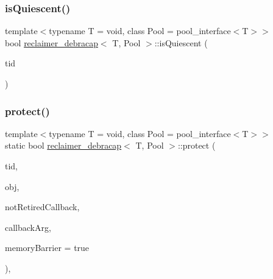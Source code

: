 \subsubsection{\texorpdfstring{is\+Quiescent()}{isQuiescent()}}
{\footnotesize\ttfamily template$<$typename T  = void, class Pool  = pool\+\_\+interface$<$\+T$>$$>$ \\
bool \hyperlink{classreclaimer__debracap}{reclaimer\+\_\+debracap}$<$ T, Pool $>$\+::is\+Quiescent (\begin{DoxyParamCaption}\item[{const int}]{tid }\end{DoxyParamCaption})\hspace{0.3cm}{\ttfamily [inline]}}

\mbox{\label{classreclaimer__debracap_a282205dc0800fb9dc45e13233f20b413}} 
\subsubsection{\texorpdfstring{protect()}{protect()}}
{\footnotesize\ttfamily template$<$typename T  = void, class Pool  = pool\+\_\+interface$<$\+T$>$$>$ \\
static bool \hyperlink{classreclaimer__debracap}{reclaimer\+\_\+debracap}$<$ T, Pool $>$\+::protect (\begin{DoxyParamCaption}\item[{const int}]{tid,  }\item[{T $\ast$const}]{obj,  }\item[{\hyperlink{globals_8h_a57f5c0d40b156d7d996492fb2f16e3cd}{Callback\+Type}}]{not\+Retired\+Callback,  }\item[{\hyperlink{globals_8h_a3de64ef48066ac6430631c8b81a15345}{Callback\+Arg}}]{callback\+Arg,  }\item[{bool}]{memory\+Barrier = {\ttfamily true} }\end{DoxyParamCaption})\hspace{0.3cm}{\ttfamily [inline]}, {\ttfamily [static]}}

\mbox{\label{classreclaimer__debracap_a26d500d9aa320c997b1424bc500de4dd}} 
